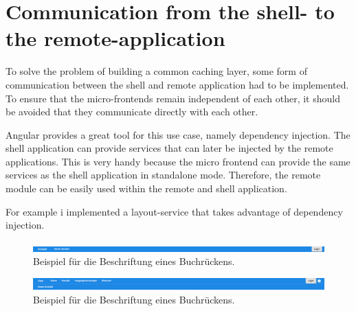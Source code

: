 \section{Communication from the shell- to the remote-application}\label{section:methods:communication-shell-remote}

To solve the problem of building a common caching layer, some form of communication between the shell and remote application had to be implemented. To ensure that the micro-frontends remain independent of each other, it should be avoided that they communicate directly with each other.

Angular provides a great tool for this use case, namely dependency injection. The shell application can provide services that can later be injected by the remote applications. This is very handy because the micro frontend can provide the same services as the shell application in standalone mode. Therefore, the remote module can be easily used within the remote and shell application.

For example i implemented a layout-service that takes advantage of dependency injection.

\ifshowImages
\begin{figure}[H]
\centering
\includegraphics[width=1\linewidth]{images/prototype-screenshots/contact-header.png}
\caption{Beispiel für die Beschriftung eines Buchrückens.}
\end{figure}
\fi

\ifshowImages
\begin{figure}[H]
\centering
\includegraphics[width=1\linewidth]{images/prototype-screenshots/host-contact-header.png}
\caption{Beispiel für die Beschriftung eines Buchrückens.}
\end{figure}
\fi
